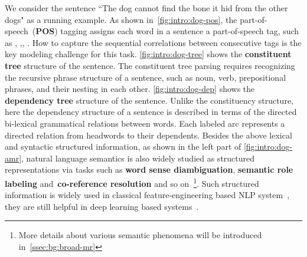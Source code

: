  We consider the sentence ``The dog cannot find
the bone it hid from the other dogs" as a running example. As shown
in~\autoref{fig:intro:dog-pos}, the part-of-speech~(\textbf{POS})
tagging assigns each word in a sentence a part-of-speech tag, such as
, ,, . How to capture
the sequential correlations between consecutive tags is the key
modeling challenge for this task.  \autoref{fig:intro:dog-tree} shows
the \textbf{constituent tree} structure of the sentence. The
constituent tree parsing requires recognizing the recursive phrase
structure of a sentence, such as noun, verb, prepositional phrases,
and their nesting in each other. \autoref{fig:intro:dog-dep} shows the
\textbf{dependency tree} structure of the sentence. Unlike the
constituency structure, here the dependency structure of a sentence is
described in terms of the directed bi-lexical grammatical relations
between words. Each labeled arc represents a directed relation from
headwords to their dependents. Besides the above lexical and syntactic
structured information, as shown in the left part of
\autoref{fig:intro:dog-amr}, natural language semantics is also widely
studied as structured representations via tasks such as \textbf{ word
  sense diambiguation}, \textbf{semantic role labeling}
and~\textbf{co-reference resolution} and so on~\footnote{More details
  about various semantic phenomena will be introduced
  in~\autoref{ssec:bg:broad-mr}}. Such structured information is
widely used in classical feature-engineering based NLP
system~\citep[e.g.,][]{Joh:Nug:08,hovy2010s,punyakanok2008importance},
they are still helpful in deep learning based
systems~\citep{moosavi-strube-2018-using,strubell-etal-2018-linguistically,bowman-etal-2016-fast}.

